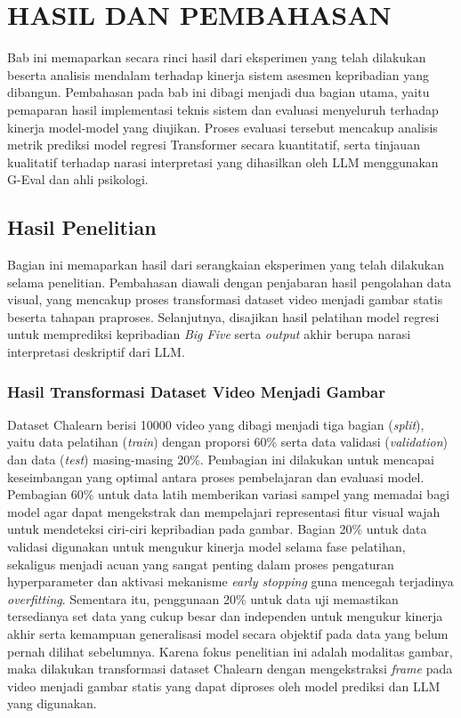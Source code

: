\chapter{HASIL DAN PEMBAHASAN}
\label{chap:hasilpembahasan}

Bab ini memaparkan secara rinci hasil dari eksperimen yang telah dilakukan beserta analisis mendalam terhadap kinerja sistem asesmen kepribadian yang dibangun. Pembahasan pada bab ini dibagi menjadi dua bagian utama, yaitu pemaparan hasil implementasi teknis sistem dan evaluasi menyeluruh terhadap kinerja model-model yang diujikan. Proses evaluasi tersebut mencakup analisis metrik prediksi model regresi Transformer secara kuantitatif, serta tinjauan kualitatif terhadap narasi interpretasi yang dihasilkan oleh LLM menggunakan G-Eval dan ahli psikologi.

\section{Hasil Penelitian}

Bagian ini memaparkan hasil dari serangkaian eksperimen yang telah dilakukan selama penelitian. Pembahasan diawali dengan penjabaran hasil pengolahan data visual, yang mencakup proses transformasi dataset video menjadi gambar statis beserta tahapan praproses. Selanjutnya, disajikan hasil pelatihan model regresi untuk memprediksi kepribadian \textit{Big Five} serta \textit{output} akhir berupa narasi interpretasi deskriptif dari LLM.

\subsection{Hasil Transformasi Dataset Video Menjadi Gambar}

Dataset Chalearn berisi 10000 video yang dibagi menjadi tiga bagian (\textit{split}), yaitu data pelatihan (\textit{train}) dengan proporsi 60\% serta data validasi (\textit{validation}) dan data (\textit{test}) masing-masing 20\%. Pembagian ini dilakukan untuk mencapai keseimbangan yang optimal antara proses pembelajaran dan evaluasi model. Pembagian 60\% untuk data latih memberikan variasi sampel yang memadai bagi model agar dapat mengekstrak dan mempelajari representasi fitur visual wajah untuk mendeteksi ciri-ciri kepribadian pada gambar. Bagian 20\% untuk data validasi digunakan untuk mengukur kinerja model selama fase pelatihan, sekaligus menjadi acuan yang sangat
penting dalam proses pengaturan hyperparameter dan aktivasi mekanisme \textit{early stopping} guna mencegah terjadinya \textit{overfitting}. Sementara itu, penggunaan 20\% untuk data uji memastikan tersedianya set data yang cukup besar dan independen untuk mengukur kinerja akhir serta kemampuan generalisasi model secara objektif pada data yang belum pernah dilihat sebelumnya. Karena fokus penelitian ini adalah modalitas gambar, maka dilakukan transformasi dataset Chalearn dengan mengekstraksi \textit{frame} pada video menjadi gambar statis yang dapat diproses oleh model prediksi dan LLM yang digunakan.

